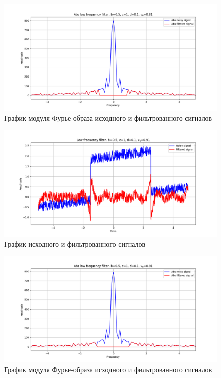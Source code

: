 \documentclass[a4paper, 12pt]{article}
\begin{document}
    \begin{figure}[!htb]
        \centering
        \includegraphics[scale=0.485]{8_abs_u_U_nolow.png}
        \captionsetup{skip=0pt}
        \caption{График модуля Фурье-образа исходного и фильтрованного сигналов}
        \label{fig:fig42}
    \end{figure}
    \begin{figure}[!htb]
        \centering
        \includegraphics[scale=0.485]{9_u_flt_u_nolow.png}
        \captionsetup{skip=0pt}
        \caption{График исходного и фильтрованного сигналов}
        \label{fig:fig43}
    \end{figure}
    \begin{figure}[!htb]
        \centering
        \includegraphics[scale=0.485]{9_abs_u_U_nolow.png}
        \captionsetup{skip=0pt}
        \caption{График модуля Фурье-образа исходного и фильтрованного сигналов}
        \label{fig:fig44}
    \end{figure}
\end{document}
